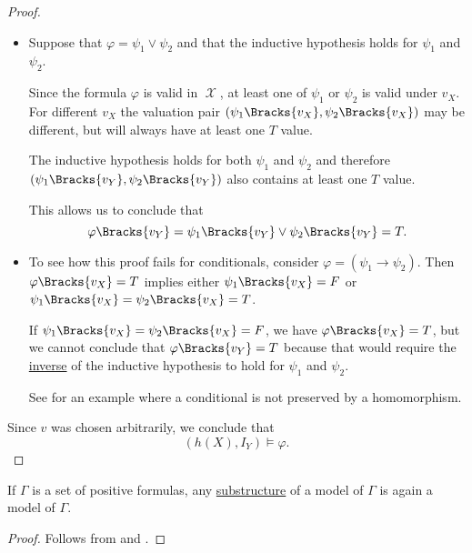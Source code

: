\begin{proof}
\begin{itemize}
    \item Suppose that \( \varphi = \psi_1 \vee \psi_2 \) and that the inductive hypothesis holds for \( \psi_1 \) and \( \psi_2 \).

    Since the formula \( \varphi \) is valid in \( \mscrX \), at least one of \( \psi_1 \) or \( \psi_2 \) is valid under \( v_X \). For different \( v_X \) the valuation pair \( (\psi_1\Bracks{v_X}, \psi_2\Bracks{v_X}) \) may be different, but will always have at least one \( T \) value.

    The inductive hypothesis holds for both \( \psi_1 \) and \( \psi_2 \) and therefore \( (\psi_1\Bracks{v_Y}, \psi_2\Bracks{v_Y}) \) also contains at least one \( T \) value.

    This allows us to conclude that
    \begin{equation*}
      \varphi\Bracks{v_Y}
      =
      \psi_1\Bracks{v_Y} \vee \psi_2\Bracks{v_Y}
      =
      T.
    \end{equation*}

    \item To see how this proof fails for conditionals, consider \( \varphi = (\psi_1 \rightarrow \psi_2) \). Then \( \varphi\Bracks{v_X} = T \) implies either \( \psi_1\Bracks{v_X} = F \) or \( \psi_1\Bracks{v_X} = \psi_2\Bracks{v_X} = T \).

    If \( \psi_1\Bracks{v_X} = \psi_2\Bracks{v_X} = F \), we have \( \varphi\Bracks{v_X} = T \), but we cannot conclude that \( \varphi\Bracks{v_Y} = T \) because that would require the \hyperref[def:material_implication/inverse]{inverse} of the inductive hypothesis to hold for \( \psi_1 \) and \( \psi_2 \).

    See  for an example where a conditional is not preserved by a homomorphism.
  \end{itemize}

  Since \( v \) was chosen arbitrarily, we conclude that
  \begin{equation*}
    (h(X), I_Y) \vDash \varphi.
  \end{equation*}
\end{proof}

\begin{corollary}\label{thm:substructure_is_model}
  If \( \Gamma \) is a set of positive formulas, any \hyperref[def:first_order_substructure]{substructure} of a model of \( \Gamma \) is again a model of \( \Gamma \).
\end{corollary}
\begin{proof}
  Follows from  and .
\end{proof}

